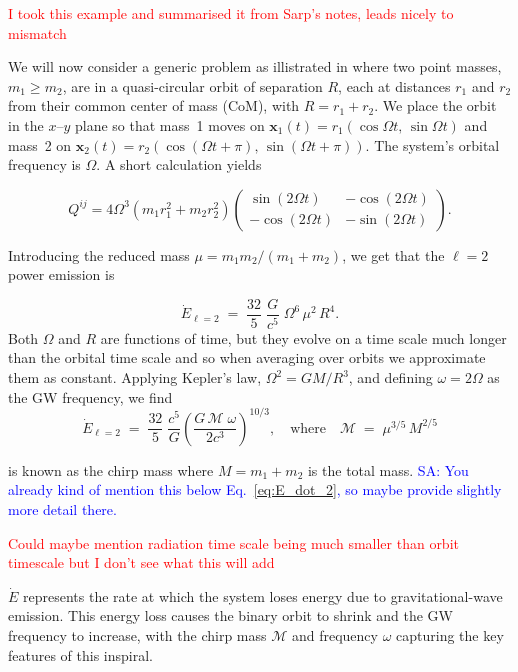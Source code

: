 \documentclass[11pt]{article}
\newcommand{\Sarp}[1]{{\textcolor{blue}{{SA: #1}} }}
\begin{document}
\textcolor{red}{I took this example and summarised it from Sarp's notes, leads nicely to mismatch}

\noindent
We will now consider a generic problem as illistrated in \cite{intoGRSarp} where two point masses, \(m_1 \ge m_2\), are in a quasi-circular orbit of separation \(R\),
each at distances \(r_1\) and \(r_2\) from their common center of mass (CoM), with
\(R = r_1 + r_2\). We place the orbit in the \(x\)--\(y\) plane so that mass~1 moves on
\(\mathbf{x}_1(t) = r_1(\cos\Omega t,\,\sin\Omega t)\) and mass~2 on
\(\mathbf{x}_2(t) = r_2(\cos(\Omega t+\pi),\,\sin(\Omega t+\pi))\). The system’s orbital
frequency is \(\Omega\). A short calculation yields

\begin{equation}
    Q^{ij} = 4 \Omega^3 \left(m_1 r_1^2 + m_2 r_2^2\right)
    \begin{pmatrix}
    \sin(2\Omega t) & -\cos(2\Omega t) \\
    -\cos(2\Omega t) & -\sin(2\Omega t)
    \end{pmatrix}.
\end{equation}

\noindent
Introducing the reduced mass \(\mu = m_1 m_2/(m_1 + m_2)\), we get that the \(\ell=2\) power emission is

\begin{equation}\label{eq:E_dot_2}
\dot{E}_{\ell=2}
\;=\;
\frac{32}{5}\;\frac{G}{c^5}\;\Omega^6\,\mu^2\,R^4.
\end{equation}
Both \(\Omega\) and \(R\) are functions of time, but they evolve on a time scale much longer than the orbital time
scale and so when averaging over orbits we approximate them as constant. Applying Kepler’s law, \(\Omega^2 = GM/R^3\), and defining
\(\omega = 2\Omega\) as the GW frequency, we find
\begin{equation}
\dot{E}_{\ell=2}
\;=\;
\frac{32}{5}\;\frac{c^5}{G}
\left(\frac{G\,\mathcal{M}\;\omega}{2c^3}\right)^{10/3},
\quad
\text{where}
\quad
\mathcal{M} \;=\;\mu^{3/5}\,M^{2/5}
\end{equation}

\noindent
is known as the chirp mass where $M = m_1+m_2$ is the total mass.
\Sarp{You already kind of mention this below Eq.~\eqref{eq:E_dot_2}, so maybe provide slightly
more detail there.}

\noindent
\textcolor{red}{Could maybe mention radiation time scale being much smaller than orbit timescale but I don't see what this will add}

\noindent
$ \dot{E} $ represents the rate at which the system loses energy due to gravitational-wave emission.
This energy loss causes the binary orbit to shrink and the GW frequency to increase, 
with the chirp mass \(\mathcal{M}\) and frequency \(\omega\) capturing the key features of this inspiral.
\end{document}
